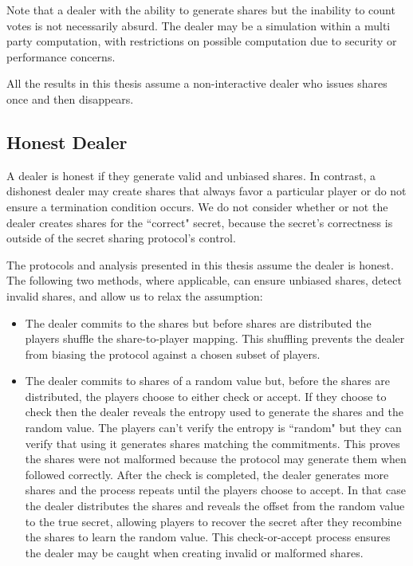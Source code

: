 \documentclass{dalcsthesis}
\begin{document}
Note that a dealer with the ability to generate shares but the inability to count votes is not necessarily absurd. The dealer may be a simulation within a multi party computation, with restrictions on possible computation due to security or performance concerns.

All the results in this thesis assume a non-interactive dealer who issues shares once and then disappears.

\subsection{Honest Dealer}

A dealer is honest if they generate valid and unbiased shares. In contrast, a dishonest dealer may create shares that always favor a particular player or do not ensure a termination condition occurs. We do not consider whether or not the dealer creates shares for the ``correct" secret, because the secret's correctness is outside of the secret sharing protocol's control.

The protocols and analysis presented in this thesis assume the dealer is honest. The following two methods, where applicable, can ensure unbiased shares, detect invalid shares, and allow us to relax the assumption:

\begin{itemize}
  \item The dealer commits to the shares but before shares are distributed the players shuffle the share-to-player mapping. This shuffling prevents the dealer from biasing the protocol against a chosen subset of players.  
  \item The dealer commits to shares of a random value but, before the shares are distributed, the players choose to either check or accept. If they choose to check then the dealer reveals the entropy used to generate the shares and the random value. The players can't verify the entropy is ``random" but they can verify that using it generates shares matching the commitments. This proves the shares were not malformed because the protocol may generate them when followed correctly. After the check is completed, the dealer generates more shares and the process repeats until the players choose to accept. In that case the dealer distributes the shares and reveals the offset from the random value to the true secret, allowing players to recover the secret after they recombine the shares to learn the random value. This check-or-accept process ensures the dealer may be caught when creating invalid or malformed shares. 
\end{itemize}
\end{document}
